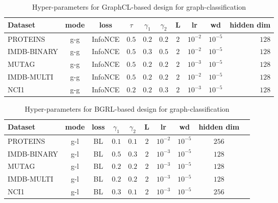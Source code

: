 \documentclass{article}
\theoremstyle{plain}
\theoremstyle{definition}
\theoremstyle{remark}
\begin{document}
\begin{table}[H]
\centering
\caption{Hyper-parameters for GraphCL-based design for graph-classification}
\label{table:hp_graphcl}
\vskip 0.15in
\begin{center}
\begin{small}
\begin{sc}
\begin{tabular}{lccccccccr}
\toprule
Dataset & mode & loss & $\tau$ &$ \gamma_1$ & $\gamma_2$ & L & lr & wd & hidden dim \\
\midrule
PROTEINS & g-g & InfoNCE & $0.5$ & $0.2$ & $0.2$ & $2$ & $10^{-2}$ & $10^{-5}$ & $128$\\
IMDB-BINARY & g-g & InfoNCE & $0.5$ & $0.3$ & $0.5$ & $2$ & $10^{-2}$ & $10^{-5}$ & $128$\\
MUTAG & g-g & InfoNCE & $0.5$ & $0.2$ & $0.2$ & $2$ & $10^{-3}$ & $10^{-5}$ & $128$\\
IMDB-MULTI & g-g & InfoNCE & $0.5$ & $0.2$ & $0.2$ & $2$ & $10^{-2}$ & $10^{-5}$ & $128$\\
NCI1 & g-g & InfoNCE & $0.2$ & $0.2$ & $0.3$ & $2$ & $10^{-3}$ & $10^{-5}$ & $128$\\
\bottomrule
\end{tabular}
\end{sc}
\end{small}
\end{center}
\vskip -0.1in
\end{table}


\begin{table}[H]
\centering
\caption{Hyper-parameters for BGRL-based design for graph-classification}
\label{table:hp_bgrl}
\vskip 0.15in
\begin{center}
\begin{small}
\begin{sc}
\begin{tabular}{lccccccccr}
\toprule
Dataset & mode & loss & $\gamma_1$ & $\gamma_2$ & L & lr & wd & hidden dim \\
\midrule
PROTEINS & g-l & BL & $0.1$ & $0.1$ & $2$ & $10^{-2}$ & $10^{-5}$ & $256$\\
IMDB-BINARY & g-l & BL & $0.5$ & $0.3$ & $2$ & $10^{-3}$ & $10^{-5}$ & $128$\\
MUTAG & g-l & BL & $0.2$ & $0.2$ & $2$ & $10^{-3}$ & $10^{-5}$ & $128$\\
IMDB-MULTI & g-l & BL & $0.2$ & $0.2$ & $2$ & $10^{-3}$ & $10^{-5}$ & $128$\\
NCI1 & g-l & BL & $0.3$ & $0.1$ & $2$ & $10^{-3}$ & $10^{-5}$ & $256$\\
\bottomrule
\end{tabular}
\end{sc}
\end{small}
\end{center}
\vskip -0.1in
\end{table}
\end{document}
